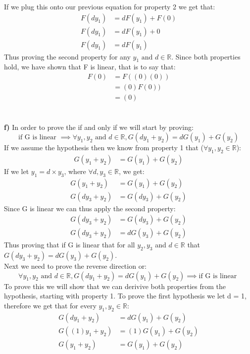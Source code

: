 \documentclass[11pt]{article}
\begin{document}
If we plug this onto our previous equation for property 2 we get that:
\begin{align*}
F(dy_1) &= dF(y_1) + F(0)\\
F(dy_1) &= dF(y_1) + 0\\
F(dy_1) &= dF(y_1)
\end{align*}
Thus proving the second property for any $y_1 \text{ and } d \in \mathbb{R}$. Since both properties hold, we have shown that F is linear, that is to say that:
\begin{align*}
F(0) &= F((0)(0))\\
       &= (0)F(0))\\
       &= (0)
\end{align*}\\\\
\textbf{f)} In order to prove the if and only if we will start by proving:
\[ \text{if G is linear } \implies \forall y_1,y_2 \text{ and }d \in \mathbb{R}, G(dy_1 + y_2) = dG(y_1) + G(y_2) \]
If we assume the hypothesis then we know from property 1 that ($\forall y_1, y_2 \in \mathbb{R}$): 
\begin{align*}
G(y_1 + y_2) &= G(y_1) + G(y_2)
\end{align*}
If we let $y_1 = d \times y_3$, where $\forall d, y_3 \in \mathbb{R}$, we get:
\begin{align*}
G(y_1 + y_2) &= G(y_1) + G(y_2)\\
G(d y_3 + y_2) &= G(d y_3) + G(y_2)
\end{align*}
Since G is linear we can thus apply the second property: 
\begin{align*}
G(d y_3 + y_2) &= G(d y_3) + G(y_2)\\
G(d y_3 + y_2) &= dG(y_3) + G(y_2)
\end{align*}
Thus proving that if G is linear that for all $y_2,y_3$ and $d \in \mathbb{R}$ that $G(d y_3 + y_2) = dG(y_3) + G(y_2)$. \\
Next we need to prove the reverse direction or:
\[  \forall y_1,y_2 \text{ and }d \in \mathbb{R}, G(dy_1 + y_2) = dG(y_1) + G(y_2) \implies \text{if G is linear } \]
To prove this we will show that we can derivive both properties from the hypothesis, starting with property 1. To prove the first hypothesis we let d = 1, therefore we get that for every $y_1, y_2 \in \mathbb{R}$:
\begin{align*}
G(dy_1 + y_2) &= dG(y_1) + G(y_2)\\
G((1)y_1 + y_2) &= (1)G(y_1) + G(y_2)\\
G(y_1 + y_2) &= G(y_1) + G(y_2)
\end{align*}
\end{document}
